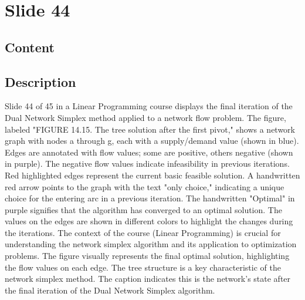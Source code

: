 \documentclass{article}%
\begin{document}
%
\newpage%
\section{Slide 44}%
\label{sec:Slide44}%
\subsection{Content}%

\underline{}
%
\subsection{Description}%
Slide 44 of 45 in a Linear Programming course displays the final iteration of the Dual Network Simplex method applied to a network flow problem. The figure, labeled "FIGURE 14.15. The tree solution after the first pivot," shows a network graph with nodes a through g, each with a supply/demand value (shown in blue). Edges are annotated with flow values; some are positive, others negative (shown in purple). The negative flow values indicate infeasibility in previous iterations. Red highlighted edges represent the current basic feasible solution. A handwritten red arrow points to the graph with the text "only choice," indicating a unique choice for the entering arc in a previous iteration. The handwritten "Optimal" in purple signifies that the algorithm has converged to an optimal solution. The values on the edges are shown in different colors to highlight the changes during the iterations. The context of the course (Linear Programming) is crucial for understanding the network simplex algorithm and its application to optimization problems. The figure visually represents the final optimal solution, highlighting the flow values on each edge. The tree structure is a key characteristic of the network simplex method. The caption indicates this is the network's state after the final iteration of the Dual Network Simplex algorithm.%
\end{document}

